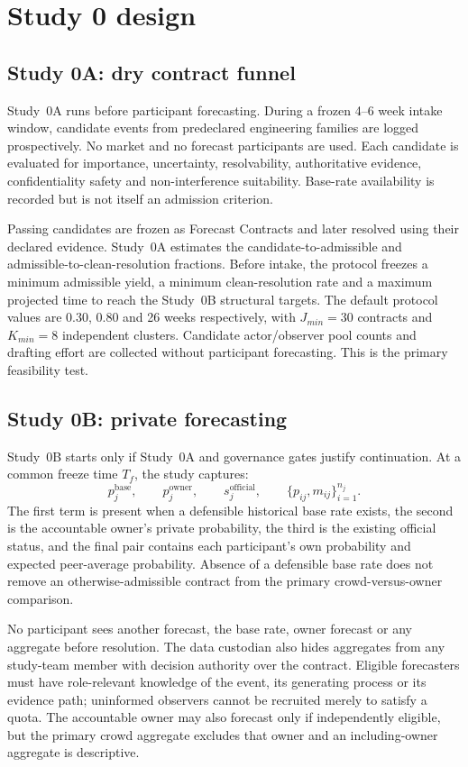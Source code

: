 \section{Study 0 design}

\subsection{Study 0A: dry contract funnel}
Study~0A runs before participant forecasting. During a frozen 4--6 week intake window, candidate events from predeclared engineering families are logged prospectively. No market and no forecast participants are used. Each candidate is evaluated for importance, uncertainty, resolvability, authoritative evidence, confidentiality safety and non-interference suitability. Base-rate availability is recorded but is not itself an admission criterion.

Passing candidates are frozen as Forecast Contracts and later resolved using their declared evidence. Study~0A estimates the candidate-to-admissible and admissible-to-clean-resolution fractions. Before intake, the protocol freezes a minimum admissible yield, a minimum clean-resolution rate and a maximum projected time to reach the Study~0B structural targets. The default protocol values are 0.30, 0.80 and 26 weeks respectively, with $J_{min}=30$ contracts and $K_{min}=8$ independent clusters. Candidate actor/observer pool counts and drafting effort are collected without participant forecasting. This is the primary feasibility test.

\subsection{Study 0B: private forecasting}
Study~0B starts only if Study~0A and governance gates justify continuation. At a common freeze time $T_f$, the study captures:
\[
p_j^{\mathrm{base}},\qquad
p_j^{\mathrm{owner}},\qquad
s_j^{\mathrm{official}},\qquad
\{p_{ij},m_{ij}\}_{i=1}^{n_j}.
\]
The first term is present when a defensible historical base rate exists, the second is the accountable owner's private probability, the third is the existing official status, and the final pair contains each participant's own probability and expected peer-average probability. Absence of a defensible base rate does not remove an otherwise-admissible contract from the primary crowd-versus-owner comparison.

No participant sees another forecast, the base rate, owner forecast or any aggregate before resolution. The data custodian also hides aggregates from any study-team member with decision authority over the contract. Eligible forecasters must have role-relevant knowledge of the event, its generating process or its evidence path; uninformed observers cannot be recruited merely to satisfy a quota. The accountable owner may also forecast only if independently eligible, but the primary crowd aggregate excludes that owner and an including-owner aggregate is descriptive.

